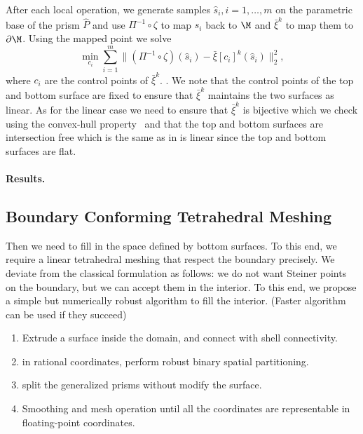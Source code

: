 After each local operation, we generate samples $\hat s_i, i=1,\dots,m$ on the parametric base of the prism $\hat P$ and use $\Pi^{-1}\circ \zeta$ to map $s_i$ back to $\M$ and $\bar \xi^k$ to map them to $\partial\M$. Using the mapped point we solve
\[
\min_{c_i} \sum_{i=1}^m \|
(\Pi^{-1}\circ \zeta)(\hat s_i) - 
\bar \xi[c_i]^k(\hat s_i)
\|_2^2,
\]
where $c_i$ are the control points of $\bar\xi^k$. 
.
We note that the control points of the top and bottom surface are fixed to ensure that $\bar\xi^k$ maintains the two surfaces as linear. As for the linear case we need to ensure that $\bar\xi^k$ is bijective which we check using the convex-hull property~\cite{johnen2013geometrical} and that the top and bottom surfaces are intersection free which is the same as in is linear since the top and bottom surfaces are flat.


\paragraph{Results.} 


\subsection{Boundary Conforming Tetrahedral Meshing}\label{cumin:sec:tets}

Then we need to fill in the space defined by bottom surfaces.
To this end, we require a linear tetrahedral meshing that respect the boundary precisely.
We deviate from the classical formulation
\cite{chew1989constrained,alexa2020conforming} as follows: we do not want Steiner points on the boundary, but we can accept them in the interior.
To this end, we propose a simple but numerically robust algorithm to fill the interior. (Faster algorithm can be used if they succeed)
\begin{enumerate}
    \item Extrude a surface inside the domain, and connect with shell connectivity.
    \item in rational coordinates, perform robust binary spatial partitioning.
    \item split the generalized prisms without modify the surface.
    \item Smoothing and mesh operation until all the coordinates are representable in floating-point coordinates. \cite{hu2018tetrahedral}
\end{enumerate}

